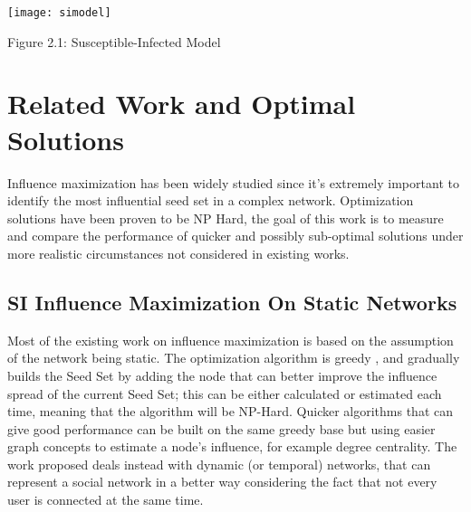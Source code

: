 \begin{center}
    \texttt{[image: simodel]}
\end{center}


\begin{center}
    Figure 2.1: Susceptible-Infected Model
\end{center}

\section{Related Work and Optimal Solutions}
\label{sec:litreview}
Influence maximization has been widely studied since it's extremely important to identify the most influential seed set in a complex network. Optimization solutions have been proven to be NP Hard, the goal of this work is to measure and compare the performance of quicker and possibly sub-optimal solutions under more realistic circumstances not considered in existing works. 

\subsection{SI Influence Maximization On Static Networks}
\label{sec:static}

Most of the existing work on influence maximization is based on the assumption of the network being static. The optimization algorithm is greedy \cite{article}, and gradually builds the Seed Set by adding the node that can better improve the influence spread of the current Seed Set; this can be either calculated or estimated each time, meaning that the algorithm will be NP-Hard. Quicker algorithms that can give good performance can be built on the same greedy base but using easier graph concepts to estimate a node’s influence, for example degree centrality. 
The work proposed deals instead with dynamic (or temporal) networks, that can represent a social network in a better way considering the fact that not every user is connected at the same time.


